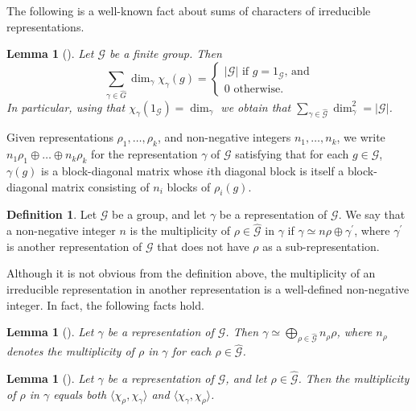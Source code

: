 \documentclass[a4paper,11pt]{article}
\newtheorem{lemma}[theorem]{Lemma}
\theoremstyle{definition}
\newtheorem{definition}[theorem]{Definition}
\newcommand{\gr}{\mathscr{G}}
\newcommand{\groupid}{1}
\begin{document}
The following is a well-known fact about sums of characters of irreducible representations. 
\begin{lemma}[]
\label{le:sum-dim-char}
    Let $\gr$ be a finite group. Then 
        \[
        \sum_{\gamma\in \widehat{G}} \dim_\gamma \chi_\gamma(g) = \begin{cases}
            |\gr| \text{ if $g=\groupid_\gr$, and}\\
            0 \text{ otherwise.}
        \end{cases}
\]
In particular, using that $\chi_\gamma(\groupid_\gr)=\dim_\gamma$ we obtain that
$\sum_{\gamma \in \widehat{\gr}}
        \dim_\gamma^2 = |\gr|$.
\end{lemma}

Given representations $\rho_1,\dots, \rho_k$, and non-negative integers $n_1,\dots, n_k$, we write $n_1\rho_1 \oplus \dots \oplus n_k \rho_k$ for the representation $\gamma$ of $\gr$ satisfying that for each $g\in \gr$, $\gamma(g)$ is a block-diagonal matrix whose $i$th diagonal block is itself a block-diagonal matrix consisting of $n_i$ blocks of $\rho_i(g)$.

\begin{definition}
    Let $\gr$ be a group, and let $\gamma$ be a representation of $\gr$. We say that a non-negative integer $n$ is the multiplicity of $\rho\in \widehat{\gr}$ in $\gamma$
    if $\gamma \simeq n\rho \oplus \gamma^\prime$, where 
    $\gamma^\prime$ is another representation of $\gr$ that does not have $\rho$ as a sub-representation.
\end{definition}



Although it is not obvious from the definition above, the multiplicity of an irreducible representation in another representation is a well-defined non-negative integer. In fact, the following facts hold.

\begin{lemma}[]
\label{le:complete_reducibility}
    Let $\gamma$ be a representation of $\gr$.
    Then
    $\gamma \simeq \bigoplus_{\rho\in \widehat{\gr}} n_\rho \rho$, where $n_\rho$ denotes the multiplicity of $\rho$ in $\gamma$ for each $\rho \in \widehat{\gr}$.
\end{lemma}

\begin{lemma}[]
\label{le:multiplicity}
    Let $\gamma$ be a representation of $\gr$, and let $\rho\in \widehat{\gr}$. Then the multiplicity of $\rho$ in $\gamma$ equals both
    $\langle
   \chi_\rho, \chi_\gamma
    \rangle$ and $\langle \chi_\gamma, \chi_\rho \rangle$.
\end{lemma}
\end{document}
